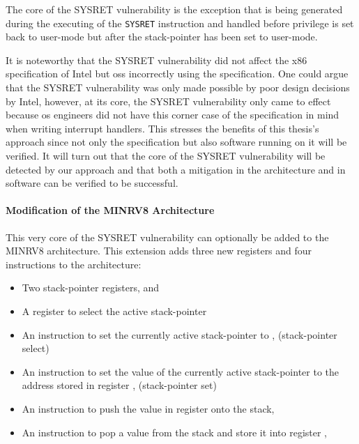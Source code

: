 The core of the SYSRET vulnerability is the exception that is being generated during the executing of the \lstinline{SYSRET} instruction and handled before privilege is set back to user-mode but after the stack-pointer has been set to user-mode.

It is noteworthy that the SYSRET vulnerability did not affect the x86 specification of Intel but \glspl{os} incorrectly using the specification.
One could argue that the SYSRET vulnerability was only made possible by poor design decisions by Intel, however, at its core, the SYSRET vulnerability only came to effect because \gls{os} engineers did not have this corner case of the specification in mind when writing interrupt handlers.
This stresses the benefits of this thesis's approach since not only the specification but also software running on it will be verified.
It will turn out that the core of the SYSRET vulnerability will be detected by our approach and that both a mitigation in the architecture and in software can be verified to be successful.

\paragraph{Modification of the MINRV8 Architecture}
This very core of the SYSRET vulnerability can optionally be added to the MINRV8 architecture.
This extension adds three new registers and four instructions to the architecture:
\begin{itemize}
    \item Two stack-pointer registers,  and 
    \item A register to select the active stack-pointer 
    \item An instruction to set the currently active stack-pointer to ,  (stack-pointer select)
    \item An instruction to set the value of the currently active stack-pointer to the address stored in register ,  (stack-pointer set)
    \item An instruction to push the value in register  onto the stack, 
    \item An instruction to pop a value from the stack and store it into register , 
\end{itemize}


